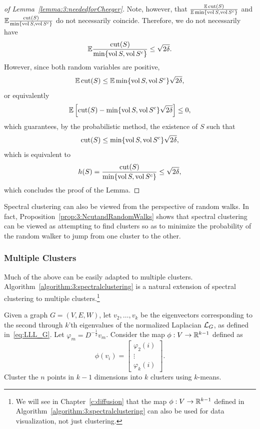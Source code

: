 \begin{proof}[of Lemma~\ref{lemma:3:neededforCheeger}]
Note, however, that $\frac{\mathbb{E} \operatorname{cut}(S)  }{\mathbb{E} \min\{ \operatorname{vol}{S},\operatorname{vol}{S^c} \}}$ and  $\mathbb{E}\frac{\operatorname{cut}(S)  }{\min\{ \operatorname{vol}{S},\operatorname{vol}{S^c} \}}$ do not necessarily coincide. Therefore, we do not necessarily have
\[
\mathbb{E}\frac{\operatorname{cut}(S)  }{\min\{ \operatorname{vol}{S},\operatorname{vol}{S^c} \}} \leq \sqrt{2\delta}.
\]
However, since both random variables are positive,
\[
\mathbb{E} \operatorname{cut}(S) \leq \mathbb{E} \min\{ \operatorname{vol}{S},\operatorname{vol}{S^c}\} \sqrt{2\delta},
\]
or equivalently
\[
\mathbb{E} \left[ \operatorname{cut}(S) -  \min\{ \operatorname{vol}{S},\operatorname{vol}{S^c} \}\sqrt{2\delta} \right] \leq 0,
\]
which guarantees, by the probabilistic method, the existence of $S$ such that
\[
\operatorname{cut}(S) \leq \min\{ \operatorname{vol}{S},\operatorname{vol}{S^c} \} \sqrt{2\delta},
\]
which is equivalent to
\[
h(S) = \frac{\operatorname{cut}(S) }{ \min\{ \operatorname{vol}{S},\operatorname{vol}{S^c} \}} \leq  \sqrt{2\delta},
\]
which concludes the proof of the Lemma.
\end{proof}





\begin{remark}
Spectral clustering can also be viewed from the perspective of random walks. In fact, Proposition~\ref{prop:3:NcutandRandomWalks} shows that spectral clustering can be viewed as attempting to find clusters so as to minimize the probability of the random walker to jump from one cluster to the other.
\end{remark}

\subsubsection*{Multiple Clusters}

Much of the above can be easily adapted to multiple clusters. Algorithm~\ref{algorithm:3:spectralclustering} is a natural extension of spectral clustering to multiple clusters.\footnote{We will see in Chapter~\ref{c:diffusion} that the map $\phi:V\to\mathbb{R}^{k-1}$ defined in Algorithm~\ref{algorithm:3:spectralclustering} can also be used for data visualization, not just clustering.} %

\begin{algorithm}[h]
Given a graph $G=(V,E,W)$, let $v_2,\dots,v_k$ be the eigenvectors corresponding to the second through $k$'th eigenvalues of the normalized Laplacian $\mathcal{L}_G$, as defined in~\eqref{eq:LLL_G}. Let $\varphi_m = D^{-\frac12}v_m$. Consider the map $\phi:V\to\mathbb{R}^{k-1}$ defined as
\[
\phi(v_i) =\left[  \begin{array}{c}   \varphi_2(i) \\ \vdots \\  \varphi_{k}(i) \end{array} \right].
\]
Cluster the $n$ points in $k-1$ dimensions into $k$ clusters using $k$-means.
\caption{Spectral Clustering}
\label{algorithm:3:spectralclustering}
\end{algorithm}

